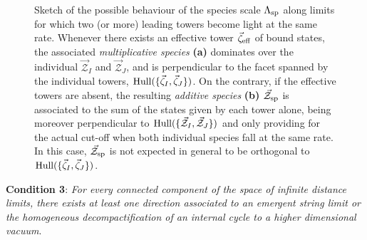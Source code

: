 \begin{figure}[htb]
	\begin{center}
        \quad
	\caption{\small Sketch of the possible behaviour of the species scale $\Lambda_{\rm sp}$ along limits for which two (or more) leading towers become light at the same rate. Whenever there exists an effective tower $\vec{\zeta}_{\rm eff}$ of bound states, the associated \emph{multiplicative species} \textbf{(a)} dominates over the individual $\vec{\mathcal{Z}}_I$ and $\vec{\mathcal{Z}}_J$, and is perpendicular to the facet spanned by the individual towers, ${\rm Hull}(\{\vec{\zeta}_I,\vec{\zeta}_J\})$. On the contrary, if the effective towers are absent, the resulting \emph{additive species} \textbf{(b)} $\vec{\mathcal{Z}}_{\rm sp}$ is associated to the sum of the states given by each tower alone, being moreover perpendicular to ${\rm Hull}(\{\vec{\mathcal{Z}}_I,\vec{\mathcal{Z}}_J\})$ and only providing for the actual cut-off when both individual species fall at the same rate. In this case, $\vec{\mathcal{Z}}_{\rm sp}$ is not expected in general to be orthogonal to ${\rm Hull}(\{\vec{\zeta}_I,\vec{\zeta}_J\})$.}
		\label{fig:add mult}
	\end{center}
\end{figure}

\begin{center}
	\textbf{Condition 3}: \textit{For every connected component of the space of infinite distance limits, there exists at least one direction associated to an emergent string limit or the homogeneous decompactification of an internal cycle to a higher dimensional vacuum}. 
\end{center}

